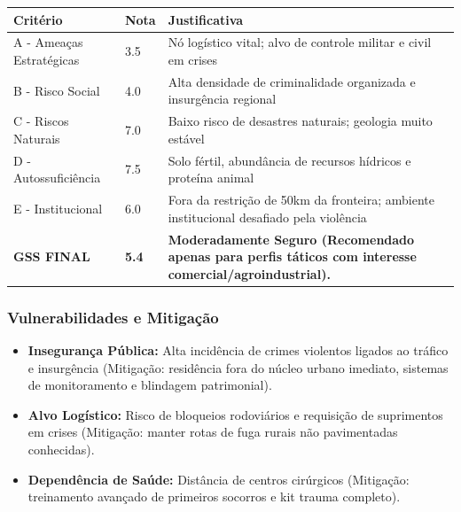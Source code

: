 \begin{table}[ht!]
\small \begin{tabular}{p{3.0cm}p{0.8cm}p{6.0cm}} \toprule
\textbf{Critério} & \textbf{Nota} & \textbf{Justificativa} \\ \midrule
A - Ameaças Estratégicas & 3.5 & Nó logístico vital; alvo de controle militar e civil em crises \\
B - Risco Social & 4.0 & Alta densidade de criminalidade organizada e insurgência regional \\
C - Riscos Naturais & 7.0 & Baixo risco de desastres naturais; geologia muito estável \\
D - Autossuficiência & 7.5 & Solo fértil, abundância de recursos hídricos e proteína animal \\
E - Institucional & 6.0 & Fora da restrição de 50km da fronteira; ambiente institucional desafiado pela violência \\
\midrule \textbf{GSS FINAL} & \textbf{5.4} & \textbf{Moderadamente Seguro (Recomendado apenas para perfis táticos com interesse comercial/\allowbreak agroindustrial).} \\ \bottomrule \end{tabular}
\end{table}
\subsubsection{Vulnerabilidades e
Mitigação}

\begin{itemize}
\tightlist
\item
  \textbf{Insegurança Pública:} Alta incidência de crimes violentos
  ligados ao tráfico e insurgência (Mitigação: residência fora do núcleo
  urbano imediato, sistemas de monitoramento e blindagem patrimonial).
\item
  \textbf{Alvo Logístico:} Risco de bloqueios rodoviários e requisição
  de suprimentos em crises (Mitigação: manter rotas de fuga rurais não
  pavimentadas conhecidas).
\item
  \textbf{Dependência de Saúde:} Distância de centros cirúrgicos
  (Mitigação: treinamento avançado de primeiros socorros e kit trauma
  completo).
\end{itemize}


